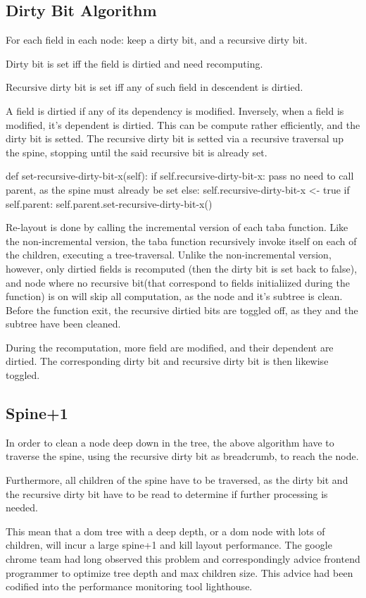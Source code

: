 \documentclass[format=acmsmall, review=false, screen=true]{acmart}
\begin{document}
\subsection{Dirty Bit Algorithm}
For each field in each node: keep a dirty bit, and a recursive dirty bit.

Dirty bit is set iff the field is dirtied and need recomputing.

Recursive dirty bit is set iff any of such field in descendent is dirtied.

A field is dirtied if any of its dependency is modified. Inversely, when a field is modified, it's dependent is dirtied. This can be compute rather efficiently, and the dirty bit is setted. The recursive dirty bit is setted via a recursive traversal up the spine, stopping until the said recursive bit is already set.

def set-recursive-dirty-bit-x(self):
  if self.recursive-dirty-bit-x:
    pass no need to call parent, as the spine must already be set
  else:
    self.recursive-dirty-bit-x <- true
    if self.parent:
      self.parent.set-recursive-dirty-bit-x()

Re-layout is done by calling the incremental version of each taba function. Like the non-incremental version, the taba function recursively invoke itself on each of the children, executing a tree-traversal. Unlike the non-incremental version, however, only dirtied fields is recomputed (then the dirty bit is set back to false), and node where no recursive bit(that correspond to fields initialiized during the function) is on will skip all computation, as the node and it's subtree is clean. Before the function exit, the recursive dirtied bits are toggled off, as they and the subtree have been cleaned.

During the recomputation, more field are modified, and their dependent are dirtied. The corresponding dirty bit and recursive dirty bit is then likewise toggled.
\subsection{Spine+1}
In order to clean a node deep down in the tree, the above algorithm have to traverse the spine, using the recursive dirty bit as breadcrumb, to reach the node.

Furthermore, all children of the spine have to be traversed, as the dirty bit and the recursive dirty bit have to be read to determine if further processing is needed.

This mean that a dom tree with a deep depth, or a dom node with lots of children, will incur a large spine+1 and kill layout performance. The google chrome team had long observed this problem and correspondingly advice frontend programmer to optimize tree depth and max children size. This advice had been codified into the performance monitoring tool lighthouse.
\end{document}
